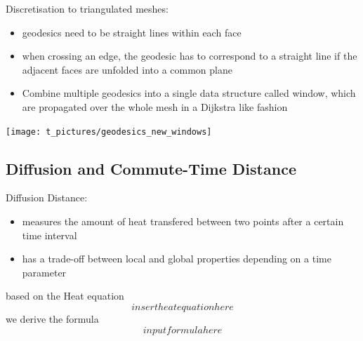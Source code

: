 \documentclass[]{beamer}
\begin{document}
	\begin{frame}
		Discretisation to triangulated meshes:
		\begin{itemize}
			\item geodesics need to be straight lines within each face
			\item when crossing an edge, the geodesic has to correspond to a straight line if the adjacent faces are unfolded into a common plane
			\item Combine multiple geodesics into a single data structure called window, which are propagated over the whole mesh in a Dijkstra like fashion
		\end{itemize}
		\texttt{[image: t\_pictures/geodesics\_new\_windows]} \\
	\end{frame}

\subsection{Diffusion and Commute-Time Distance}
	\begin{frame}
		Diffusion Distance:\\
		\begin{itemize}
			\item measures the amount of heat transfered between two points after a certain time interval
			\item has a trade-off between local and global properties depending on a time parameter
		\end{itemize}
		\pause
		based on the Heat equation
		$$ insert heat equation here$$
		we derive the formula
		$$input formula here$$

	\end{frame}
\end{document}
